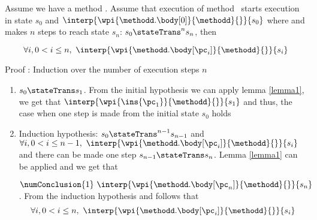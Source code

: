\begin{lemma3}\label{lemma3}
Assume we have a method \methodd. Assume that  execution of method  \methodd \ starts execution
 in state $s_{0}$ and $\interp{ \wpi{\methodd.\body[0] } {\methodd}{}}{ s_{0}}$ where 
and makes $n$ steps to reach state $s_n$: $s_{0} \stateTrans^{n} s_{n} $, then
  
$$\forall i,  0 < i \le n, \  \interp{ \wpi{\methodd.\body[\pc_i] } {\methodd}{ }}{ s_{i}} $$

\end{lemma3}
Proof : Induction over the number of execution steps $n$
\begin{enumerate}
    \item  $s_{0} \stateTrans s_{1}$. From the initial hypothesis   we can apply lemma \ref{lemma1}, we get that 
             $\interp{ \wpi{\ins{\pc_{1}}}{\methodd}{  } } { s_{1} }  $ and thus, the  case when one step is made from the initial state
             $s_0$  holds   
    \item Induction hypothesis:   $s_{0} \stateTrans^{n - 1} s_{n - 1}$ and \\
           $\forall i,  0 < i \le n - 1, \  \interp{ \wpi{\methodd.\body[\pc_i] } {\methodd}{}}{ s_{i}} $
           and there can be made one step $s_{n- 1} \stateTrans s_n$.  Lemma \ref{lemma1} can be applied and we get that
	    
           $\numConclusion{1} \ \interp{ \wpi{\methodd.\body[\pc_n] } {\methodd}{ } }{ s_{n}} $. 
	   From the induction hypothesis and  follows that 
	   $$\forall i,  0 < i \le n, \  \interp{ \wpi{\methodd.\body[\pc_i] } {\methodd}{ }}{ s_{i}} $$
            
\end{enumerate}



